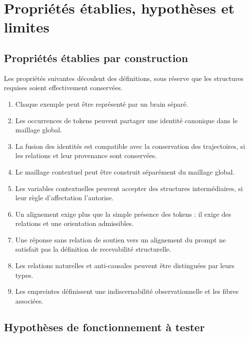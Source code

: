 \documentclass[11pt,a4paper]{report}
\theoremstyle{definition}
\theoremstyle{plain}
\theoremstyle{remark}
\begin{document}
\chapter{Propriétés établies, hypothèses et limites}

\section{Propriétés établies par construction}

Les propriétés suivantes découlent des définitions, sous réserve
que les structures requises soient effectivement conservées.

\begin{enumerate}[label=\arabic*.]
  \item Chaque exemple peut être représenté par un brain séparé.
  \item Les occurrences de tokens peuvent partager une identité
        canonique dans le maillage global.
  \item La fusion des identités est compatible avec la conservation
        des trajectoires, si les relations et leur provenance
        sont conservées.
  \item Le maillage contextuel peut être construit séparément du
        maillage global.
  \item Les variables contextuelles peuvent accepter des
        structures intermédiaires, si leur règle d'affectation
        l'autorise.
  \item Un alignement exige plus que la simple présence des tokens :
        il exige des relations et une orientation admissibles.
  \item Une réponse sans relation de soutien vers un alignement
        du prompt ne satisfait pas la définition de recevabilité
        structurelle.
  \item Les relations naturelles et anti-causales peuvent être
        distinguées par leurs types.
  \item Les empreintes définissent une indiscernabilité
        observationnelle et les fibres associées.
\end{enumerate}

\section{Hypothèses de fonctionnement à tester}
\end{document}
